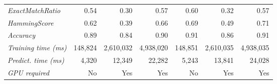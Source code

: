 \begin{table}[]
\begin{tabular}{@{}ll|rrr|rrr@{}}
                                  \midrule
\multicolumn{2}{l|}{\textit{ExactMatchRatio}}          & 0.54    & 0.30      & 0.57      & 0.60    & 0.32      & 0.57      \\
\multicolumn{2}{l|}{\textit{HammingScore}}            & 0.62    & 0.39      & 0.66      & 0.69    & 0.49      & 0.71      \\
\multicolumn{2}{l|}{\textit{Accuracy}}                 & 0.89    & 0.84      & 0.90      & 0.91    & 0.86      & 0.91      \\
\midrule
\multicolumn{2}{l|}{\textit{Training time (ms)}}            & 148,824 & 2,610,032 & 4,938,020 & 148,851 & 2,610,035 & 4,938,035 \\
\multicolumn{2}{l|}{\textit{Predict. time (ms)}}            & 4,320   & 12,349    & 22,282    & 5,243   & 13,841    & 24,028    \\
\midrule
\multicolumn{2}{l|}{\textit{GPU required}}             & No      & Yes       & Yes       & No      & Yes       & Yes       \\ \bottomrule
\end{tabular}
\end{table}